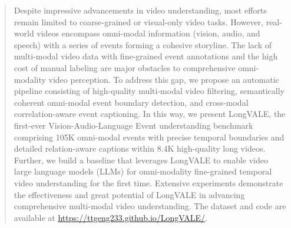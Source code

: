 \begin{abstract}
Despite impressive advancements in video understanding, most efforts remain limited to coarse-grained or visual-only video tasks. However, real-world videos encompass omni-modal information (vision, audio, and speech) with a series of events forming a cohesive storyline. 
The lack of multi-modal video data with fine-grained event annotations and the high cost of manual labeling are major obstacles to comprehensive omni-modality video perception.
To address this gap, we propose an automatic pipeline consisting of high-quality multi-modal video filtering, semantically coherent omni-modal event boundary detection, and cross-modal correlation-aware event captioning. 
In this way, we present LongVALE, the first-ever Vision-Audio-Language Event understanding benchmark comprising 105K omni-modal events with precise temporal boundaries and detailed relation-aware captions within 8.4K high-quality long videos.
Further, we build a baseline that leverages LongVALE to enable video large language models (LLMs) for omni-modality fine-grained temporal video understanding for the first time.
Extensive experiments demonstrate the effectiveness and great potential of LongVALE in advancing comprehensive multi-modal video understanding. The dataset and code are available at \url{https://ttgeng233.github.io/LongVALE/}.
\end{abstract}
\vspace{-5.5mm}